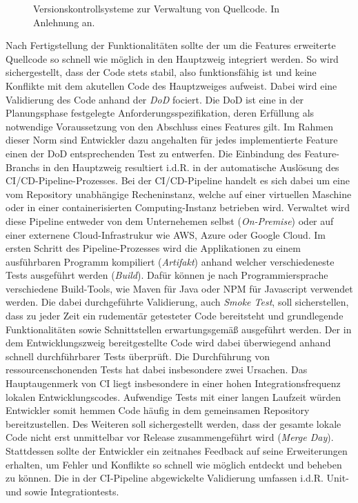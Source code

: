 \begin{center}
	\begin{figure}[H]
		\centering
		\caption[Versionskontrollsysteme zur Verwaltung von Quellcode]{Versionskontrollsysteme zur Verwaltung von Quellcode. In Anlehnung an.}
		\label{fig:VCS}
	\end{figure}
\end{center}
\vspace*{-10mm}
Nach Fertigstellung der Funktionalitäten sollte der um die Features erweiterte Quellcode so schnell wie möglich in den Hauptzweig integriert werden. So wird sichergestellt, dass der Code stets stabil, also funktionsfähig ist und keine Konflikte mit dem akutellen Code des Hauptzweiges aufweist. Dabei wird eine Validierung des Code anhand der \textit{\ac*{DoD}} fociert. Die DoD ist eine in der Planungsphase festgelegte Anforderungsspezifikation, deren Erfüllung als notwendige Voraussetzung von den Abschluss eines Features gilt. Im Rahmen dieser Norm sind Entwickler dazu angehalten für jedes implementierte Feature einen der DoD entsprechenden Test zu entwerfen. Die Einbindung des Feature-Branchs in den Hauptzweig resultiert i.d.R. in der automatische Auslösung des CI/CD-Pipeline-Prozesses. Bei der CI/CD-Pipeline handelt es sich dabei um eine vom Repository unabhängige Recheninstanz, welche auf einer virtuellen Maschine oder in einer containerisierten Computing-Instanz betrieben wird. Verwaltet wird diese Pipeline entweder von dem Unternehemen selbst (\textit{On-Premise}) oder auf einer externene Cloud-Infrastrukur wie AWS, Azure oder Google Cloud. Im ersten Schritt des Pipeline-Prozesses wird die Applikationen zu einem ausführbaren Programm kompiliert (\textit{Artifakt}) anhand welcher verschiedeneste Tests ausgeführt werden (\textit{Build}). Dafür können je nach Programmiersprache verschiedene Build-Tools, wie Maven für Java oder NPM für Javascript verwendet werden. Die dabei durchgeführte Validierung, auch \textit{Smoke Test}, soll  sicherstellen, dass zu jeder Zeit ein rudementär getesteter Code bereitsteht und grundlegende Funktionalitäten sowie Schnittstellen erwartungsgemäß ausgeführt werden. Der in dem Entwicklungszweig bereitgestellte Code wird dabei überwiegend anhand schnell durchführbarer Tests überprüft. Die Durchführung von ressourcenschonenden Tests hat dabei insbesondere zwei Ursachen. Das Hauptaugenmerk von CI liegt insbesondere in einer hohen Integrationsfrequenz lokalen Entwicklungscodes. Aufwendige Tests mit einer langen Laufzeit würden Entwickler somit hemmen Code häufig in dem gemeinsamen Repository bereitzustellen. Des Weiteren soll sichergestellt werden, dass der gesamte lokale Code nicht erst unmittelbar vor Release zusammengeführt wird (\textit{Merge Day}). Stattdessen sollte der Entwickler ein zeitnahes Feedback auf seine Erweiterungen erhalten, um Fehler und Konflikte so schnell wie möglich entdeckt und beheben zu können. Die in der CI-Pipeline abgewickelte Validierung umfassen i.d.R. Unit- und sowie Integrationtests.
